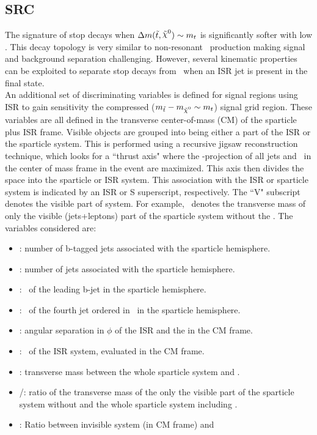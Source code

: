  

\subsection{SRC}
\label{sec:SRC}
The signature of stop decays when $\Delta m(\stop,\LSP)\sim m_{t}$ is significantly softer with low \met. This decay topology is very similar to non-resonant \ttbar\ production making signal and background separation challenging. However, several kinematic properties can be exploited to separate stop decays from \ttbar\ when an ISR jet is present in the final state. \\

An additional set of discriminating variables is defined for signal regions using ISR to gain sensitivity the compressed ($\mstop-\mLSP\sim m_t$) signal grid region. These variables are all defined in the transverse center-of-mass (CM) of the sparticle plus ISR frame. Visible objects are grouped into being either a part of the ISR or the sparticle system. This is performed using a recursive jigsaw reconstruction technique\cite{RJR_ISR}, which looks for a ``thrust axis" where the \pt-projection of all jets and \met\ in the center of mass frame in the event are maximized.  This axis then divides the space into the sparticle or ISR system.  This association with the ISR or sparticle system is indicated by an ISR or S superscript, respectively. The ``V" subscript denotes the visible part of system.  For example, \mV\ denotes the transverse mass of only the visible (jets+leptons) part of the sparticle system without the \met.  The variables considered are:

\begin{itemize}
\item  \nBJetS: number of b-tagged jets associated with the sparticle hemisphere.
\item \nJetS: number of jets associated with the sparticle hemisphere.
\item  \pTSBZero: \pt\ of the leading b-jet in the sparticle hemisphere.
\item  \pTSFour: \pt\ of the fourth jet ordered in \pt\ in the sparticle hemisphere.
\item  \dPhiISRMET: angular separation in $\phi$ of the ISR and the \met in the CM frame.
\item  \pTISR: \pt\ of the ISR system, evaluated in the CM frame.
\item  \mS: transverse mass between the whole sparticle system and \met.
\item  \mV/\mS: ratio of the transverse mass of the only the visible part of the sparticle system without \met and the whole sparticle system including \met.
\item  \rISR: Ratio between invisible system (\met in CM frame) and \pTISR
\end{itemize}

